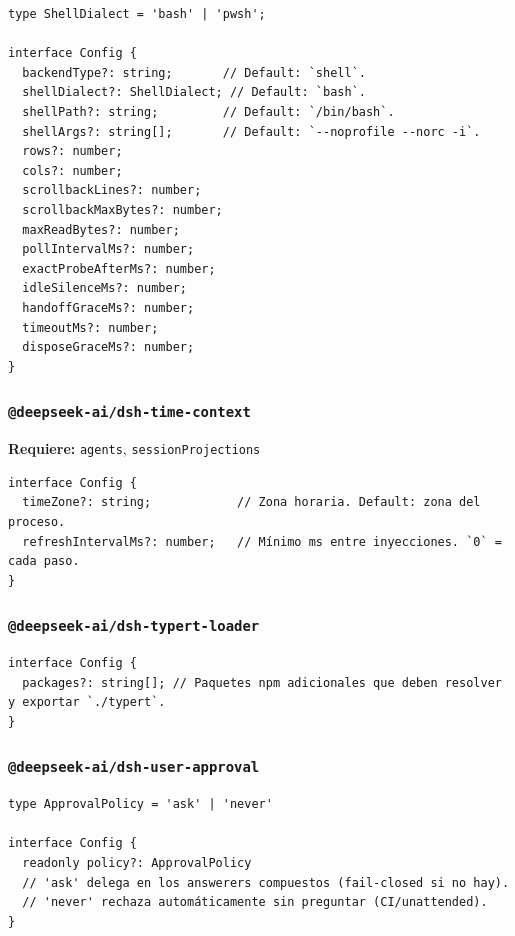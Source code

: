 \documentclass[11pt,a4paper]{article}
\begin{document}
\begin{lstlisting}
type ShellDialect = 'bash' | 'pwsh';

interface Config {
  backendType?: string;       // Default: `shell`.
  shellDialect?: ShellDialect; // Default: `bash`.
  shellPath?: string;         // Default: `/bin/bash`.
  shellArgs?: string[];       // Default: `--noprofile --norc -i`.
  rows?: number;
  cols?: number;
  scrollbackLines?: number;
  scrollbackMaxBytes?: number;
  maxReadBytes?: number;
  pollIntervalMs?: number;
  exactProbeAfterMs?: number;
  idleSilenceMs?: number;
  handoffGraceMs?: number;
  timeoutMs?: number;
  disposeGraceMs?: number;
}
\end{lstlisting}


\subsubsection*{\texttt{@deepseek-ai/dsh-time-context}}


\textbf{Requiere:} \texttt{agents}, \texttt{sessionProjections}


\begin{lstlisting}
interface Config {
  timeZone?: string;            // Zona horaria. Default: zona del proceso.
  refreshIntervalMs?: number;   // Mínimo ms entre inyecciones. `0` = cada paso.
}
\end{lstlisting}


\subsubsection*{\texttt{@deepseek-ai/dsh-typert-loader}}


\begin{lstlisting}
interface Config {
  packages?: string[]; // Paquetes npm adicionales que deben resolver y exportar `./typert`.
}
\end{lstlisting}


\subsubsection*{\texttt{@deepseek-ai/dsh-user-approval}}


\begin{lstlisting}
type ApprovalPolicy = 'ask' | 'never'

interface Config {
  readonly policy?: ApprovalPolicy
  // 'ask' delega en los answerers compuestos (fail-closed si no hay).
  // 'never' rechaza automáticamente sin preguntar (CI/unattended).
}
\end{lstlisting}
\end{document}
